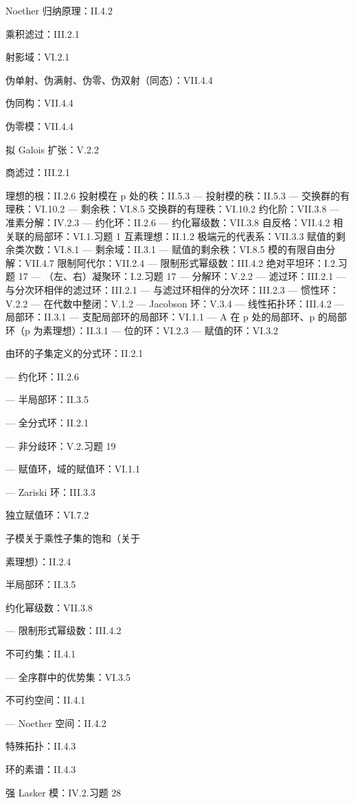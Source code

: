 Noether 归纳原理：II.4.2

乘积滤过：III.2.1

射影域：VI.2.1

伪单射、伪满射、伪零、伪双射（同态）：VII.4.4

伪同构：VII.4.4

伪零模：VII.4.4

拟 Galois 扩张：V.2.2

商滤过：III.2.1

理想的根：II.2.6 投射模在 p 处的秩：II.5.3 --- 投射模的秩：II.5.3 --- 交换群的有理秩：VI.10.2 --- 剩余秩：VI.8.5 交换群的有理秩：VI.10.2 约化阶：VII.3.8 --- 准素分解：IV.2.3 --- 约化环：II.2.6 --- 约化幂级数：VII.3.8 自反格：VII.4.2 相关联的局部环：VI.1.习题 1 互素理想：II.1.2 极端元的代表系：VII.3.3 赋值的剩余类次数：VI.8.1 --- 剩余域：II.3.1 --- 赋值的剩余秩：VI.8.5 模的有限自由分解：VII.4.7 限制阿代尔：VII.2.4 --- 限制形式幂级数：III.4.2 绝对平坦环：I.2.习题 17 --- （左、右）凝聚环：I.2.习题 17 --- 分解环：V.2.2 --- 滤过环：III.2.1 --- 与分次环相伴的滤过环：III.2.1 --- 与滤过环相伴的分次环：III.2.3 --- 惯性环：V.2.2 --- 在代数中整闭：V.1.2 --- Jacobson 环：V.3.4 --- 线性拓扑环：III.4.2 --- 局部环：II.3.1 --- 支配局部环的局部环：VI.1.1 --- A 在 p 处的局部环、p 的局部环（p 为素理想）：II.3.1 --- 位的环：VI.2.3 --- 赋值的环：VI.3.2

由环的子集定义的分式环：II.2.1

--- 约化环：II.2.6

--- 半局部环：II.3.5

--- 全分式环：II.2.1

--- 非分歧环：V.2.习题 19

--- 赋值环，域的赋值环：VI.1.1

--- Zariski 环：III.3.3

独立赋值环：VI.7.2

子模关于乘性子集的饱和（关于

素理想）：II.2.4

半局部环：II.3.5

约化幂级数：VII.3.8

--- 限制形式幂级数：III.4.2

不可约集：II.4.1

--- 全序群中的优势集：VI.3.5

不可约空间：II.4.1

--- Noether 空间：II.4.2

特殊拓扑：II.4.3

环的素谱：II.4.3

强 Lasker 模：IV.2.习题 28

